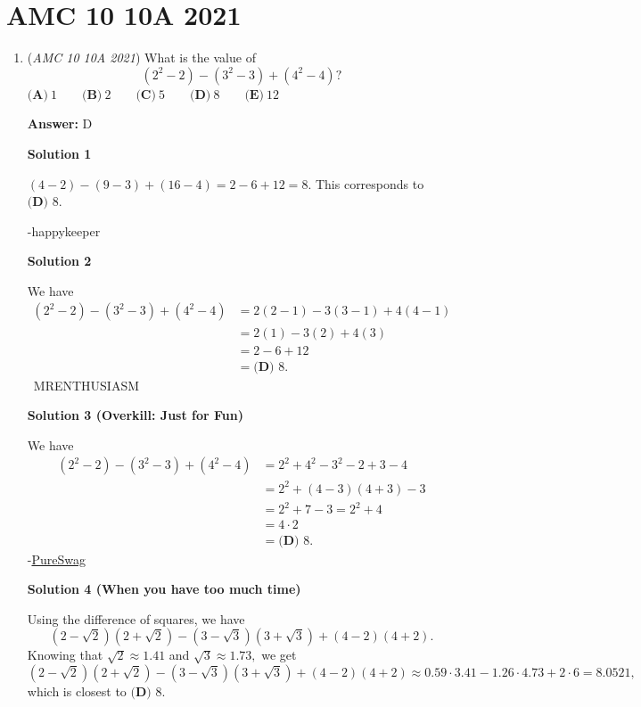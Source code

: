 \section{AMC 10 10A 2021}
        \begin{enumerate}
        	\item (\textit{AMC 10 10A 2021}) What is the value of
 \[(2^2-2)-(3^2-3)+(4^2-4)?\]$\textbf{(A)} ~1 \qquad\textbf{(B)} ~2 \qquad\textbf{(C)} ~5 \qquad\textbf{(D)} ~8 \qquad\textbf{(E)} ~12$

 \textbf{Answer: }D



\textbf{Solution 1}

$(4-2)-(9-3)+(16-4)=2-6+12=8.$ This corresponds to $\boxed{\textbf{(D) } 8}.$

 -happykeeper

 



\textbf{Solution 2}

We have
 \begin{align*} \left(2^2-2\right)-\left(3^2-3\right)+\left(4^2-4\right) &= 2(2-1)-3(3-1)+4(4-1) \\ &= 2(1)-3(2)+4(3) \\ &= 2-6+12 \\ &= \boxed{\textbf{(D) } 8}. \end{align*}
~MRENTHUSIASM

 



\textbf{Solution 3 (Overkill: Just for Fun)}

We have
 \begin{align*} (2^2-2)-(3^2-3)+(4^2-4) &= 2^2+4^2-3^2-2+3-4 \\ &=2^2+(4-3)(4+3)-3 \\ &=2^2+7-3=2^2+4 \\ &=4\cdot 2 \\ &=\boxed{\textbf{(D) } 8}. \end{align*}
-\href{https://artofproblemsolving.com/wiki/index.php?title=User:PureSwag}{PureSwag}

 



\textbf{Solution 4 (When you have too much time)}

Using the difference of squares, we have 
 \[(2-\sqrt{2})(2+\sqrt{2}) - (3-\sqrt{3})(3+\sqrt{3}) + (4-2)(4+2).\]Knowing that $\sqrt{2} \approx 1.41$ and $\sqrt{3} \approx 1.73,$ we get 
 \[(2-\sqrt{2})(2+\sqrt{2}) - (3-\sqrt{3})(3+\sqrt{3}) + (4-2)(4+2) \approx 0.59\cdot 3.41 -1.26\cdot 4.73 + 2 \cdot 6 =8.0521,\] which is closest to $\boxed{\textbf{(D) } 8}.$




\end{enumerate}
